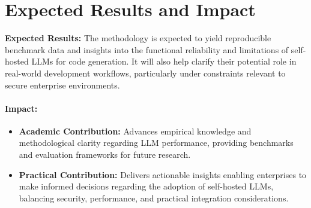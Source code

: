 \section{Expected Results and Impact}
\label{sec:expected-results-and-impact}

\textbf{Expected Results:} The methodology is expected to yield reproducible benchmark data and insights into the functional reliability and limitations of self-hosted \glspl{LLM} for code generation. It will also help clarify their potential role in real-world development workflows, particularly under constraints relevant to secure enterprise environments.

\paragraph{Impact:}

\begin{itemize}
	\item \textbf{Academic Contribution:} Advances empirical knowledge and methodological clarity regarding \gls{LLM} performance, providing benchmarks and evaluation frameworks for future research.
	\item \textbf{Practical Contribution:} Delivers actionable insights enabling enterprises to make informed decisions regarding the adoption of self-hosted \glspl{LLM}, balancing security, performance, and practical integration considerations.
\end{itemize}